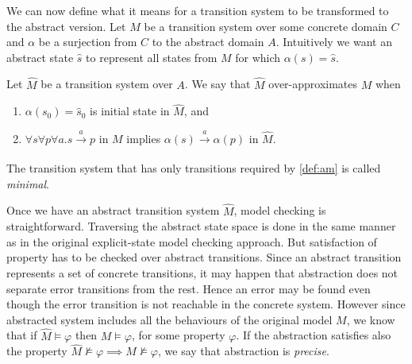 We can now define what it means for a transition system to be transformed to the
abstract version. Let $M$ be a transition system over some concrete domain $C$
and $\alpha$ be a surjection from $C$ to the abstract domain $A$. Intuitively we
want an abstract state $\widehat{s}$ to represent all states from $M$ for which
$\alpha(s) = \widehat{s}$.
\begin{definition}\label{def:am}
    Let $\widehat{M}$ be a transition system over $A$. We say that $\widehat{M}$
    over-approximates $M$ when
    \begin{enumerate}
        \item $\alpha(s_0) = \widehat{s}_0$ is initial state in $\widehat{M}$, and
        \item $\forall s\forall p\forall a . s \xrightarrow[]{a} p$ in $M$ implies
            $\alpha(s)
            \xrightarrow[]{a} \alpha(p)$ in $\widehat{M}$.
    \end{enumerate}
\end{definition}

\noindent
{}
The transition system that has only transitions required by \autoref{def:am} is called
\emph{minimal}.

Once we have an abstract transition system $\widehat{M}$, model checking is
straightforward. Traversing the abstract state space is done in the same manner
as in the original explicit-state model checking approach. But satisfaction of
property has to be checked over abstract transitions. Since an abstract transition
represents a set of concrete transitions, it may happen that abstraction does not
separate error transitions from the rest. Hence an error may be found even
though the error transition is not reachable in the concrete system. However
since abstracted system includes all the behaviours of the original model $M$, we know that if $\widehat{M}
\models \varphi$ then $M \models \varphi$, for some property $\varphi$. If the
abstraction satisfies also the property $\widehat{M} \not\models \varphi
\implies M \not\models \varphi$, we say that abstraction is
\emph{precise}.
